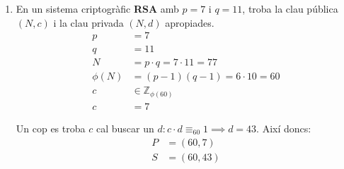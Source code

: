 \documentclass[a4paper]{article}
\begin{document}
\begin{enumerate}
\item En un sistema criptogràfic \textbf{RSA} amb $p = 7$ i $q = 11$, troba la clau pública $(N, c)$ i la clau privada $(N, d)$ apropiades.
\begin{align*}
	p &= 7 \\
	q &= 11 \\
	N &= p \cdot q = 7 \cdot 11 = 77 \\
	\phi(N) &= (p - 1)(q - 1) = 6 \cdot 10 = 60 \\
	c &\in \mathbb{Z}_{\phi(60)} \\
	c &= 7
\end{align*}

Un cop es troba $c$ cal buscar un $d : c \cdot d \equiv_{60} 1 \implies d = 43$. Així doncs:
\begin{align*}
	P &= (60, 7) \\
	S &= (60, 43)
\end{align*}

\end{enumerate}
\end{document}
